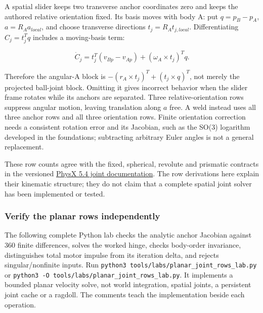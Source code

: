 A spatial slider keeps two transverse anchor coordinates zero and keeps the authored relative orientation fixed. Its basis moves with body A: put \(q=p_B-p_A\), \(a=R_Aa_{local}\), and choose transverse directions \(t_j=R_At_{j,local}\). Differentiating \(C_j=t_j^Tq\) includes a moving-basis term:

\[
\dot C_j=t_j^T(v_{Bp}-v_{Ap})+(\omega_A\times t_j)^Tq.
\]

Therefore the angular-A block is \(-(r_A\times t_j)^T+(t_j\times q)^T\), not merely the projected ball-joint block. Omitting it gives incorrect behavior when the slider frame rotates while its anchors are separated. Three relative-orientation rows suppress angular motion, leaving translation along \(a\) free. A weld instead uses all three anchor rows and all three orientation rows. Finite orientation correction needs a consistent rotation error and its Jacobian, such as the SO(3) logarithm developed in the foundations; subtracting arbitrary Euler angles is not a general replacement.

These row counts agree with the fixed, spherical, revolute and prismatic contracts in the versioned \href{https://nvidia-omniverse.github.io/PhysX/physx/5.4.0/docs/Joints.html}{PhysX 5.4 joint documentation}. The row derivations here explain their kinematic structure; they do not claim that a complete spatial joint solver has been implemented or tested.

\subsubsection{Verify the planar rows independently}\label{06-engine-ii-ch033-verify-the-planar-rows-independently}

The following complete Python lab checks the analytic anchor Jacobian against 360 finite differences, solves the worked hinge, checks body-order invariance, distinguishes total motor impulse from its iteration delta, and rejects singular/nonfinite inputs. Run \texttt{python3\ tools/labs/planar\_joint\_rows\_lab.py} or \texttt{python3\ -O\ tools/labs/planar\_joint\_rows\_lab.py}. It implements a bounded planar velocity solve, not world integration, spatial joints, a persistent joint cache or a ragdoll. The comments teach the implementation beside each operation.

